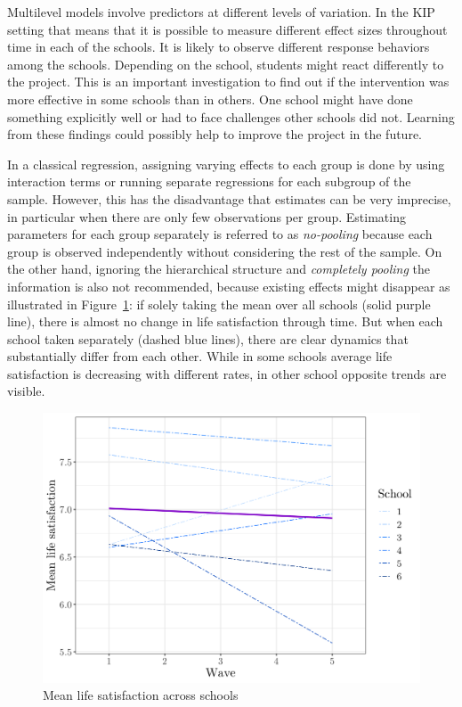 \documentclass[a4, 12pt]{article}
\begin{document}
Multilevel models involve predictors at different levels of variation. In the KIP setting that means that it is possible to measure different effect sizes throughout time in each of the schools. It is likely to observe different response behaviors among the schools. Depending on the school, students might react differently to the project. This is an important investigation to find out if the intervention was more effective in some schools than in others. One school might have done something explicitly well or had to face challenges other schools did not. Learning from these findings could possibly help to improve the project in the future.

In a classical regression, assigning varying effects to each group is done by using interaction terms or running separate regressions for each subgroup of the sample. However, this has the disadvantage that estimates can be very imprecise, in particular when there are only few observations per group. Estimating parameters for each group separately is referred to as \emph{no-pooling} because each group is observed independently without considering the rest of the sample. On the other hand, ignoring the hierarchical structure and \emph{completely pooling} the information is also not recommended, because existing effects might disappear as illustrated in Figure~\ref{fig:lsat-vs-time}: if solely taking the mean over all schools (solid purple line), there is almost no change in life satisfaction through time. But when each school taken separately (dashed blue lines), there are clear dynamics that substantially differ from each other. While in some schools average life satisfaction is decreasing with different rates, in other school opposite trends are visible.

\begin{figure}[H]

{\centering \includegraphics[width=0.8\linewidth,]{../figures/lsat_vs_time_by_school_treated} 

}

\caption{Mean life satisfaction across schools}\label{fig:lsat-vs-time}
\end{figure}
\end{document}
